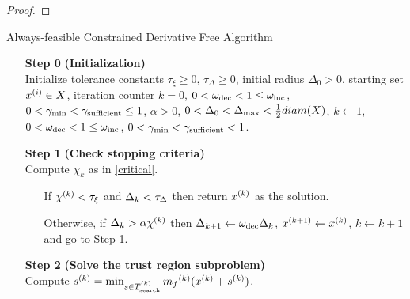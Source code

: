 \begin{proof}

\end{proof}






\begin{algorithm}[H]
    \caption{Always-feasible Constrained Derivative Free Algorithm}
    \label{constrained_dfo}
    \begin{itemize}
        \item[\textbf{Step 0}] \textbf{(Initialization)} \\
            Initialize tolerance constants 
            $\tau_{\xi} \ge 0$,
            $\tau_{\Delta} \ge 0$,
            initial radius $\Delta_0 > 0$,
            starting set $x^{(i)} \in X$,
            iteration counter $k=0$,
            $0 < \omega_{\text{dec}} < 1 \le \omega_{\text{inc}}$,
            $0 < \gamma_{\text{min}} < \gamma_{\text{sufficient}} \le 1$,
            $\alpha > 0$,
            $0 < \Delta_0 < \Delta_{\text{max}} < \frac 1 2 diam(X)$,
            $k \gets 1$,
            $0 < \omega_{\text{dec}} < 1 \le \omega_{\text{inc}}$,
            $0 < \gamma_{\text{min}} < \gamma_{\text{sufficient}} < 1$.
        
        \item[\textbf{Step 1}] \textbf{(Check stopping criteria)} \\
            Compute $\chi_k$ as in \cref{critical}. \begin{itemize}
                \item[] If $ {\chi^{(k)}} < \tau_{\xi} $ and $\Delta_k <\tau_{\Delta}$ then return ${x}^{(k)}$ as the solution.
                \item[] Otherwise, if $\Delta_k > \alpha {\chi^{(k)}}$ then 
                $\Delta_{k+1} \gets \omega_{\text{dec}}\Delta_{k}$, 
                $x^{(k+1)} \gets {x}^{(k)}$,
                $k \gets k+1$ and go to Step 1.
            \end{itemize}
        
        \item[\textbf{Step 2}] \textbf{(Solve the trust region subproblem)} \\
            Compute ${{s}^{(k)}} = \min_{s \in {T_{\text{search}}^{(k)}}} {{m}_f}^{(k)}({x}^{(k)} + {{s}^{(k)}})$.
            

\end{itemize}
\end{algorithm}

